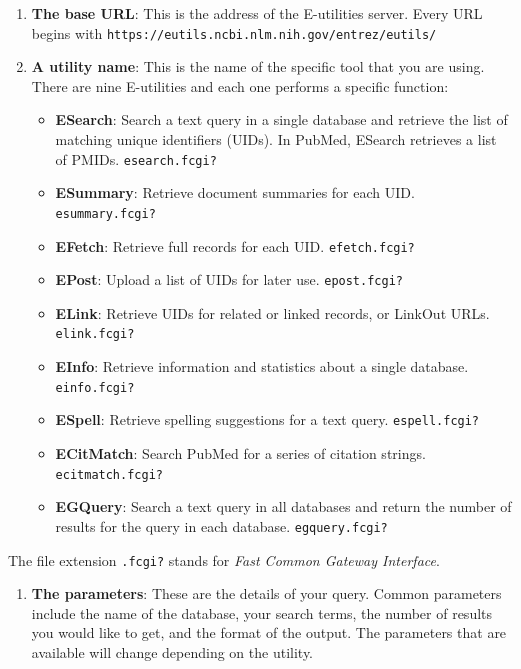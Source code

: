 \documentclass[
]{book}
\providecommand{\tightlist}{%
  \setlength{\itemsep}{0pt}\setlength{\parskip}{0pt}}
\begin{document}
\begin{enumerate}
\def\labelenumi{\arabic{enumi})}
\item
  \textbf{The base URL}: This is the address of the E-utilities server. Every URL
  begins with \texttt{https://eutils.ncbi.nlm.nih.gov/entrez/eutils/}
\item
  \textbf{A utility name}: This is the name of the specific tool that you are using.
  There are nine E-utilities and each one performs a specific function:

  \begin{itemize}
  \tightlist
  \item
    \textbf{ESearch}: Search a text query in a single database and retrieve the
    list of matching unique identifiers (UIDs). In PubMed, ESearch retrieves a
    list of PMIDs. \texttt{esearch.fcgi?}
  \item
    \textbf{ESummary}: Retrieve document summaries for each UID. \texttt{esummary.fcgi?}
  \item
    \textbf{EFetch}: Retrieve full records for each UID. \texttt{efetch.fcgi?}
  \item
    \textbf{EPost}: Upload a list of UIDs for later use. \texttt{epost.fcgi?}
  \item
    \textbf{ELink}: Retrieve UIDs for related or linked records, or LinkOut URLs.
    \texttt{elink.fcgi?}
  \item
    \textbf{EInfo}: Retrieve information and statistics about a single database.
    \texttt{einfo.fcgi?}
  \item
    \textbf{ESpell}: Retrieve spelling suggestions for a text query.
    \texttt{espell.fcgi?}
  \item
    \textbf{ECitMatch}: Search PubMed for a series of citation strings.
    \texttt{ecitmatch.fcgi?}
  \item
    \textbf{EGQuery}: Search a text query in all databases and return the number
    of results for the query in each database. \texttt{egquery.fcgi?}
  \end{itemize}
\end{enumerate}

The file extension \texttt{.fcgi?} stands for \emph{Fast Common Gateway Interface}.

\begin{enumerate}
\def\labelenumi{\arabic{enumi})}
\setcounter{enumi}{2}
\tightlist
\item
  \textbf{The parameters}: These are the details of your query. Common parameters
  include the name of the database, your search terms, the number of results you
  would like to get, and the format of the output. The parameters that are
  available will change depending on the utility.
\end{enumerate}
\end{document}
